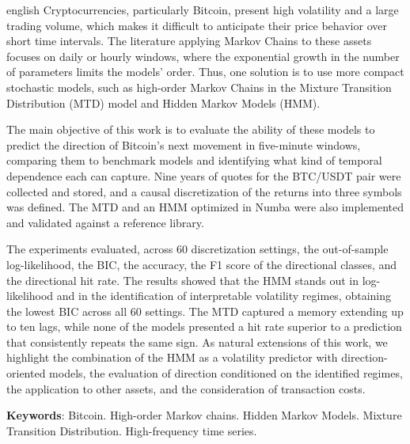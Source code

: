 \documentclass[
    12pt,                %
    openright,           %
    oneside,             %
    a4paper,             %
    english,             %
    brazil               %
]{abntex2}
\begin{document}
\begin{resumo}[Abstract]
 \begin{otherlanguage*}{english}
   Cryptocurrencies, particularly Bitcoin, present high volatility and a large trading volume, which makes it difficult to anticipate their price behavior over short time intervals. 
   The literature applying Markov Chains to these assets focuses on daily or hourly windows, where the exponential growth in the number of parameters limits the models' order. 
   Thus, one solution is to use more compact stochastic models, such as high-order Markov Chains in the Mixture Transition Distribution (MTD) model and Hidden Markov Models (HMM).

   The main objective of this work is to evaluate the ability of these models to predict the direction of Bitcoin's next movement in five-minute windows, comparing them to 
   benchmark models and identifying what kind of temporal dependence each can capture. Nine years of quotes for the BTC/USDT pair were collected and stored, and a causal 
   discretization of the returns into three symbols was defined. The MTD and an HMM optimized in Numba were also implemented and validated against a reference library.

   The experiments evaluated, across 60 discretization settings, the out-of-sample log-likelihood, the BIC, the accuracy, the F1 score of the directional classes, and the 
   directional hit rate. The results showed that the HMM stands out in log-likelihood and in the identification of interpretable volatility regimes, obtaining the lowest 
   BIC across all 60 settings. The MTD captured a memory extending up to ten lags, while none of the models presented a hit rate superior to a prediction that consistently 
   repeats the same sign. As natural extensions of this work, we highlight the combination of the HMM as a volatility predictor with direction-oriented models, 
   the evaluation of direction conditioned on the identified regimes, the application to other assets, and the consideration of transaction costs.

   \vspace{\onelineskip}

   \noindent
   \textbf{Keywords}: Bitcoin. High-order Markov chains. Hidden Markov Models. Mixture Transition Distribution. High-frequency time series.
 \end{otherlanguage*}
\end{resumo}
\end{document}

